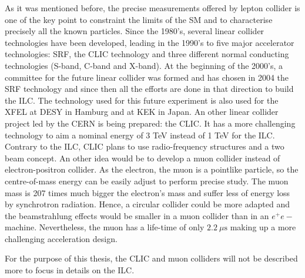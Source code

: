     As it was mentioned before, the precise measurements offered by lepton collider is one of the key point to constraint the limits of the \gls{SM} and to characterise precisely all the known particles.
    Since the 1980's, several linear collider technologies have been developed, leading in the 1990's to five major accelerator technologies: \gls{SRF}, the \gls{CLIC} technology and three different normal conducting technologies (S-band, C-band and X-band).
    At the beginning of the 2000's, a committee for the future linear collider was formed and has chosen in 2004 the \gls{SRF} technology and since then all the efforts are done in that direction to build the \gls{ILC}.
    The technology used for this future experiment is also used for the XFEL at DESY in Hamburg and at KEK in Japan.
    An other linear collider project led by the CERN is being prepared: the \gls{CLIC}.
    It has a more challenging technology to aim a nominal energy of 3 TeV instead of 1 TeV for the \gls{ILC}.
    Contrary to the \gls{ILC}, \gls{CLIC} plans to use radio-frequency structures and a two beam concept. 
    An other idea would be to develop a muon collider instead of electron-positron collider\cite{Lipton2012}.
    As the electron, the muon is a pointlike particle, so the centre-of-mass energy can be easily adjust to perform precise study.
    The muon mass is 207 times much bigger the electron's mass and suffer less of energy loss by synchrotron radiation.
    Hence, a circular collider could be more adapted and the beamstrahlung effects would be smaller in a muon collider than in an $e^+e-$ machine.
    Nevertheless, the muon has a life-time of only $2.2 \ \mu\text{s}$ making up a more challenging acceleration design.
    

    For the purpose of this thesis, the \gls{CLIC} and muon colliders will not be described more to focus in details on the \gls{ILC}.
     
